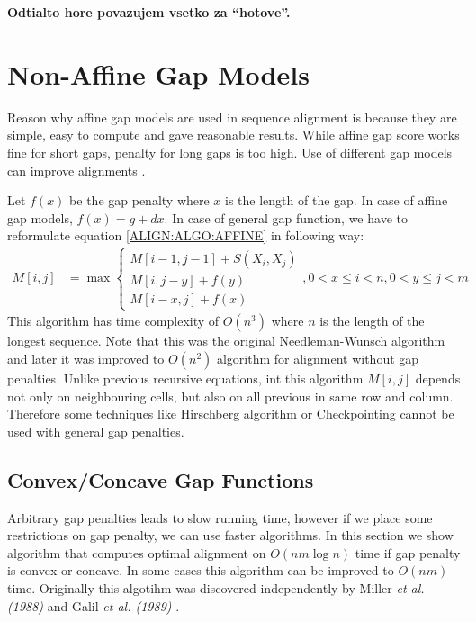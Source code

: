 \bigskip
{\large\bf Odtialto hore povazujem vsetko za ``hotove''. }
\bigskip



\section{Non-Affine Gap Models} 

Reason why affine gap models are used in sequence alignment is because they are
simple, easy to compute and gave reasonable results. While affine gap score
works fine for short gaps, penalty for long gaps is too high. Use of different 
gap models can improve alignments \cite{Gill2004,Cartwright2009}.

Let $f(x)$ be the gap penalty where $x$ is the length of the gap. In case of
affine gap models, $f(x)=g+dx$. In case of general gap function, we have to
reformulate equation \ref{ALIGN:ALGO:AFFINE} in following way:
\begin{align}
M[i,j] &= \max
\begin{cases}
 M[i-1,j-1]+S(X_i,X_j)\\
 M[i,j-y]+f(y)\\
 M[i-x,j]+f(x)
\end{cases}, 0<x\leq i<n,0<y\leq j<m\label{ALIGN:ARBITRARYGAPEQUATION}
\end{align}
This algorithm has time complexity of $O(n^3)$ where $n$ is the length of the
longest sequence. Note that this was the original Needleman-Wunsch 
algorithm \cite{Needleman1970} and later it was improved to $O(n^2)$ algorithm
\cite{Sankoff1972} for alignment without gap penalties.
Unlike previous recursive equations, int this algorithm $M[i,j]$ depends not
only on neighbouring cells, but also on all previous in same row and column.
Therefore some techniques like Hirschberg algorithm or Checkpointing cannot be
used with general gap penalties.

\subsection{Convex/Concave Gap Functions}

Arbitrary gap penalties leads to slow running time, however if we place some
restrictions on gap penalty, we can use faster algorithms. In this section we
show algorithm that computes optimal alignment on $O(nm\log n)$ time if gap
penalty is convex or concave. In some cases this algorithm can be improved to
$O(nm)$ time. Originally this algotihm was discovered independently by Miller
{\it et al. (1988)} and Galil {\it et al. (1989)} \nocite{Miller1988,Galil1989}.

